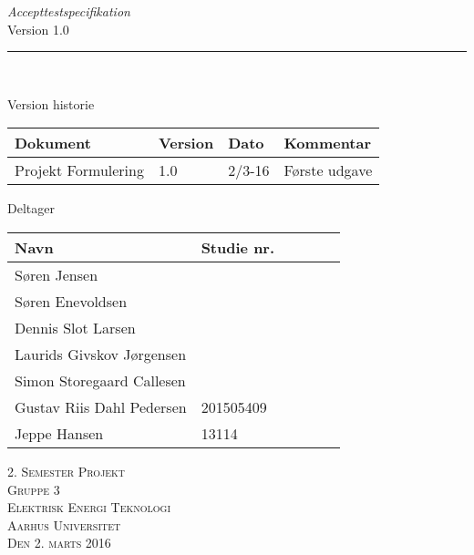 \thispagestyle{empty}
\begin{flushright}
\vspace{3cm}

\phantom{hul}

\phantom{hul}

\phantom{hul}

\textsl{\Huge Accepttestspecifikation} \\ %
Version 1.0

\rule{16cm}{3mm} \\ \vspace{1.5cm}
\vspace{1cm}


\begin{table}[H] 
\flushleft
Version historie \\
	\begin{tabular}{|l|l|l|l|} %
		
																			 \hline
		Dokument				& Version   & Dato   	& Kommentar 	 \\ \hline 	%
		Projekt Formulering 	& 1.0   	& 2/3-16 	& Første udgave	 \\ \hline 
		
	\end{tabular} 
\end{table}

\begin{table}[H] 
	\flushleft
\phantom{hul}

\phantom{hul}
	Deltager
	
	\begin{tabular}{|l|l|l|l|l|l|} %
		\hline 	%
		Navn						&Studie nr.		\\ \hline 	%
		Søren Jensen	 			& 		   		\\ \hline 
		Søren Enevoldsen 			&				\\ \hline
		Dennis Slot Larsen			&				\\ \hline
		Laurids Givskov Jørgensen	&				\\ \hline
		Simon Storegaard Callesen	&				\\ \hline
		Gustav Riis Dahl Pedersen	&201505409				\\ \hline
		Jeppe Hansen				&13114			\\ \hline
		
	\end{tabular} 
\end{table}




\vspace{2cm} 
\textsc{\Large 2. Semester Projekt \\
Gruppe 3 \\
Elektrisk Energi Teknologi \\
Aarhus Universitet \\
Den 2. marts 2016 \\}
\end{flushright}